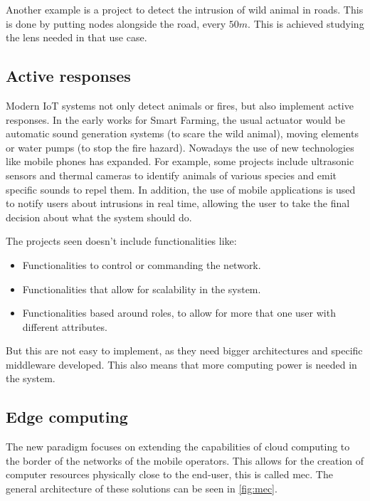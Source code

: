 Another example is a project to detect the intrusion of wild animal in roads\cite{IoTSensorNetwork}. This is done by putting nodes alongside the road, every $50 m$. This is achieved studying the lens needed in that use case. 

\subsection{Active responses}
Modern IoT systems not only detect animals or fires, but also implement active responses. In the early works for Smart Farming, the 
usual actuator would be automatic sound generation systems (to scare the wild animal), moving elements or water pumps (to stop the fire hazard).
Nowadays the use of new technologies like mobile phones has expanded. For example, some projects include ultrasonic sensors 
and thermal cameras to identify animals of various species and emit specific sounds to repel them. 
In addition, the use of mobile applications is used to notify users about intrusions in real time, allowing the user to take the final decision 
about what the system should do.

The projects seen doesn't include functionalities like:
\begin{itemize}
    \item Functionalities to control or commanding the network.
    \item Functionalities that allow for scalability in the system. 
    \item Functionalities based around roles, to allow for more that one user with different attributes.
\end{itemize}

But this are not easy to implement, as they need bigger architectures and specific middleware developed. This also means that more computing power is needed in the system.

\clearpage
\subsection{Edge computing}

The new  paradigm focuses on extending the capabilities of cloud computing to the border of the networks of the mobile operators. This allows for the creation of computer resources physically close 
to the end-user, this is called \acrshort{mec}. The general architecture of these solutions can be seen in \autoref{fig:mec}.

